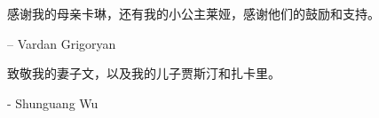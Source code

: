 感谢我的母亲卡琳，还有我的小公主莱娅，感谢他们的鼓励和支持。\par
\begin{flushright}
– Vardan Grigoryan
\end{flushright}

致敬我的妻子文，以及我的儿子贾斯汀和扎卡里。\par
\begin{flushright}
- Shunguang Wu
\end{flushright}


\newpage